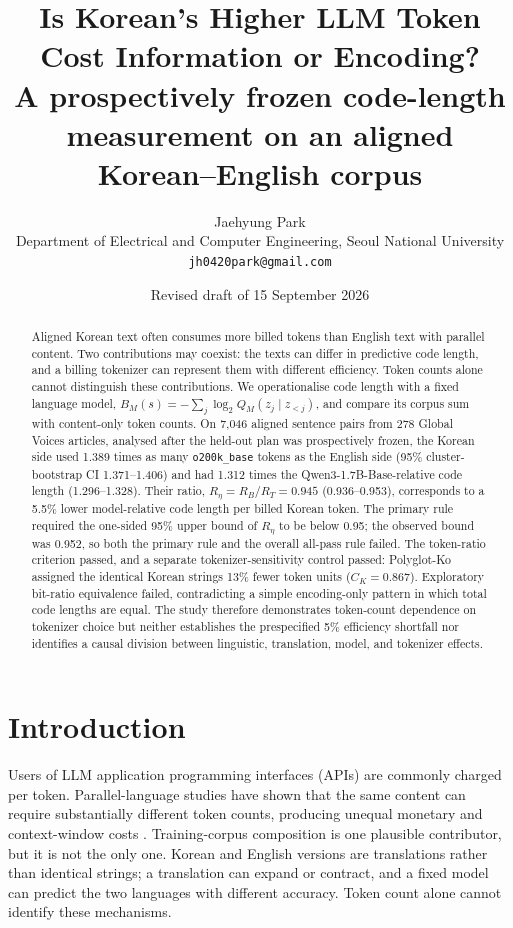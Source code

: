 \documentclass[11pt,a4paper]{article}
\title{Is Korean's Higher LLM Token Cost Information or Encoding?\\
\large A prospectively frozen code-length measurement on an aligned Korean--English corpus}
\author{Jaehyung Park\\
Department of Electrical and Computer Engineering, Seoul National University\\
\texttt{jh0420park@gmail.com}}
\date{Revised draft of 15 September 2026}
\newcommand{\RT}{R_{T}}
\newcommand{\RB}{R_{B}}
\newcommand{\Reta}{R_{\eta}}
\newcommand{\CK}{C_{K}}
\begin{document}
\maketitle

\begin{abstract}
Aligned Korean text often consumes more billed tokens than English text with
parallel content. Two contributions may coexist: the texts can differ in
predictive code length, and a billing tokenizer can represent them with
different efficiency. Token counts alone cannot distinguish these
contributions. We operationalise code length with a fixed language model,
$B_M(s)=-\sum_j\log_2 Q_M(z_j\mid z_{<j})$, and compare its corpus sum with
content-only token counts. On 7{,}046 aligned sentence pairs from 278 Global
Voices articles, analysed after the held-out plan was prospectively frozen,
the Korean side used 1.389 times as many \texttt{o200k\_base} tokens as the
English side (95\% cluster-bootstrap CI 1.371--1.406) and had 1.312 times the
Qwen3-1.7B-Base-relative code length (1.296--1.328). Their ratio,
$\Reta=\RB/\RT=0.945$ (0.936--0.953), corresponds to a 5.5\% lower
model-relative code length per billed Korean token. The primary rule required
the one-sided 95\% upper bound of $\Reta$ to be below 0.95; the observed bound
was 0.952, so both the primary rule and the overall all-pass rule failed. The
token-ratio criterion passed, and a separate tokenizer-sensitivity control
passed: Polyglot-Ko assigned the identical Korean strings 13\% fewer token
units ($\CK=0.867$). Exploratory bit-ratio equivalence failed, contradicting a
simple encoding-only pattern in which total code lengths are equal. The study
therefore demonstrates token-count dependence on tokenizer choice but neither
establishes the prespecified 5\% efficiency shortfall nor identifies a causal
division between linguistic, translation, model, and tokenizer effects.
\end{abstract}

\section{Introduction}

Users of LLM application programming interfaces (APIs) are commonly charged
per token. Parallel-language studies have shown that the same content can
require substantially different token counts, producing unequal monetary and
context-window costs \citep{ahia2023,petrov2023}. Training-corpus composition
is one plausible contributor, but it is not the only one. Korean and English
versions are translations rather than identical strings; a translation can
expand or contract, and a fixed model can predict the two languages with
different accuracy. Token count alone cannot identify these mechanisms.
\end{document}
